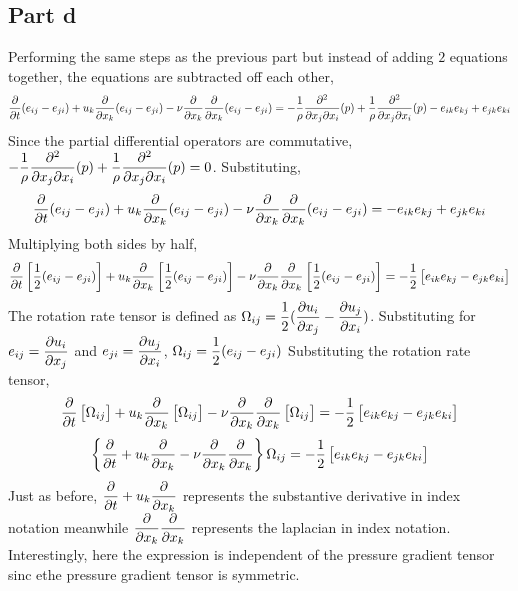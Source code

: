\documentclass[class=report, 12pt, crop=false]{standalone}
\begin{document}
\begin{center}
\subsection{Part d}
\begin{comment}
\end{comment}
Performing the same steps as the previous part but instead of adding $2$ equations together, the equations are subtracted off each other,
$$\frac{\partial}{\partial t}(e_{ij}-e_{ji}) + u_k\frac{\partial }{\partial x_k}(e_{ij}-e_{ji}) - \nu\frac{\partial}{\partial x_k}\frac{\partial}{\partial x_k}(e_{ij}-e_{ji}) = -\frac{1}{\rho}\frac{\partial^2}{\partial x_j\partial x_i}(p) + \frac{1}{\rho}\frac{\partial^2}{\partial x_j\partial x_i}(p) - e_{ik}e_{kj} + e_{jk}e_{ki}$$
Since the partial differential operators are commutative, $\displaystyle{ -\frac{1}{\rho}\frac{\partial^2}{\partial x_j\partial x_i}(p) + \frac{1}{\rho}\frac{\partial^2}{\partial x_j\partial x_i}(p)=0}$. Substituting,
$$\frac{\partial}{\partial t}(e_{ij}-e_{ji}) + u_k\frac{\partial }{\partial x_k}(e_{ij}-e_{ji}) - \nu\frac{\partial}{\partial x_k}\frac{\partial}{\partial x_k}(e_{ij}-e_{ji}) = - e_{ik}e_{kj} + e_{jk}e_{ki}$$
Multiplying both sides by half,
$$\frac{\partial}{\partial t}\left[\frac{1}{2}(e_{ij}-e_{ji})\right] + u_k\frac{\partial }{\partial x_k}\left[\frac{1}{2}(e_{ij}-e_{ji})\right] - \nu\frac{\partial}{\partial x_k}\frac{\partial}{\partial x_k}\left[\frac{1}{2}(e_{ij}-e_{ji})\right] = - \frac{1}{2}\left[e_{ik}e_{kj} - e_{jk}e_{ki}\right]$$
The rotation rate tensor is defined as $\displaystyle{\Omega_{ij} = \frac{1}{2}(\frac{\partial u_i}{\partial x_j}-\frac{\partial u_j}{\partial x_i})}$. Substituting for $\displaystyle{e_{ij} = \frac{\partial u_i}{\partial x_j}}$ and $\displaystyle{e_{ji} = \frac{\partial u_j}{\partial x_i}}$, $\displaystyle{\Omega_{ij} = \frac{1}{2}(e_{ij}-e_{ji})}$
Substituting the rotation rate tensor,
$$\frac{\partial}{\partial t}\left[\Omega_{ij}\right] + u_k\frac{\partial }{\partial x_k}\left[\Omega_{ij}\right] - \nu\frac{\partial}{\partial x_k}\frac{\partial}{\partial x_k}\left[\Omega_{ij}\right] = - \frac{1}{2}\left[e_{ik}e_{kj} - e_{jk}e_{ki}\right]$$
$$\left\{\frac{\partial}{\partial t} + u_k\frac{\partial }{\partial x_k} - \nu\frac{\partial}{\partial x_k}\frac{\partial}{\partial x_k}\right\}\Omega_{ij} = - \frac{1}{2}\left[e_{ik}e_{kj} - e_{jk}e_{ki}\right]$$
Just as before, $\displaystyle{\frac{\partial}{\partial t} + u_k\frac{\partial}{\partial x_k}}$ represents the substantive derivative in index notation meanwhile $\displaystyle{\frac{\partial}{\partial x_k}\frac{\partial}{\partial x_k}}$ represents the laplacian in index notation. Interestingly, here the expression is independent of the pressure gradient tensor sinc ethe pressure gradient tensor is symmetric.
\end{center}
\end{document}
